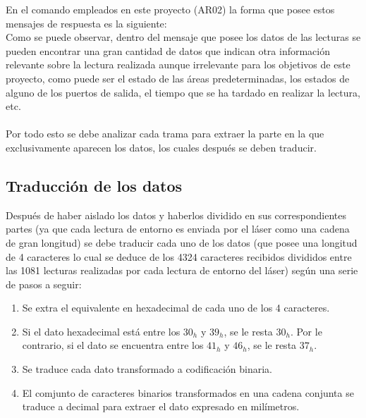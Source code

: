 En el comando empleados en este proyecto (AR02) la forma que posee estos mensajes de respuesta es la siguiente:\\
Como se puede observar, dentro del mensaje que posee los datos de las lecturas se pueden encontrar una gran cantidad de datos que indican otra información relevante sobre la lectura realizada aunque irrelevante para los objetivos de este proyecto, como puede ser el estado de las áreas predeterminadas, los estados de alguno de los puertos de salida, el tiempo que se ha tardado en realizar la lectura, etc.\\
\\
Por todo esto se debe analizar cada trama para extraer la parte en la que exclusivamente aparecen los datos, los cuales después se deben traducir.

\subsection{Traducción de los datos}

Después de haber aislado los datos y haberlos dividido en sus correspondientes partes (ya que cada lectura de entorno es enviada por el láser como una cadena de gran longitud) se debe traducir cada uno de los datos (que posee una longitud de 4 caracteres lo cual se deduce de los 4324 caracteres recibidos divididos entre las 1081 lecturas realizadas por cada lectura de entorno del láser) según una serie de pasos a seguir:
\begin{enumerate}
	\item Se extra el equivalente en hexadecimal de cada uno de los 4 caracteres.
	\item Si el dato hexadecimal está entre los $30_{h}$ y  $39_{h}$, se le resta  $30_{h}$. Por le contrario, si el dato se encuentra entre los  $41_{h}$ y  $46_{h}$, se le resta $37_{h}$.
	\item Se traduce cada dato transformado a codificación binaria.
	\item El comjunto de caracteres binarios transformados en una cadena conjunta se traduce a decimal para extraer el dato expresado en milímetros.
\end{enumerate}

